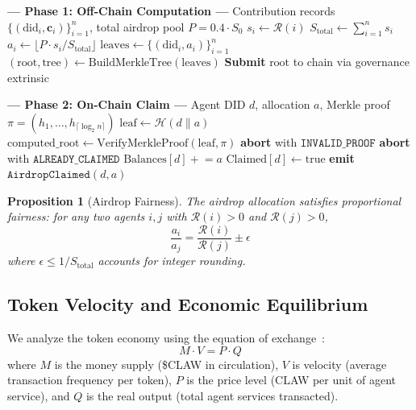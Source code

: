 \documentclass{article}
\newtheorem{proposition}[theorem]{Proposition}
\begin{document}
\begin{algorithm}[t]
\caption{Airdrop Computation and Claim}
\label{alg:airdrop}
\begin{algorithmic}[1]
\STATE \textbf{--- Phase 1: Off-Chain Computation ---}
\REQUIRE Contribution records $\{(\text{did}_i, \mathbf{c}_i)\}_{i=1}^{n}$, total airdrop pool $P = 0.4 \cdot S_0$
    \STATE $s_i \leftarrow \mathcal{R}(i)$ 
\ENDFOR
\STATE $S_{\text{total}} \leftarrow \sum_{i=1}^{n} s_i$
    \STATE $a_i \leftarrow \lfloor P \cdot s_i / S_{\text{total}} \rfloor$ 
\ENDFOR
\STATE $\text{leaves} \leftarrow \{(\text{did}_i, a_i)\}_{i=1}^{n}$
\STATE $(\text{root}, \text{tree}) \leftarrow \text{BuildMerkleTree}(\text{leaves})$
\STATE \textbf{Submit} $\text{root}$ to chain via governance extrinsic

\STATE
\STATE \textbf{--- Phase 2: On-Chain Claim ---}
\REQUIRE Agent DID $d$, allocation $a$, Merkle proof $\pi = (h_1, \ldots, h_{\lceil \log_2 n \rceil})$
\STATE $\text{leaf} \leftarrow \mathcal{H}(d \| a)$
\STATE $\text{computed\_root} \leftarrow \text{VerifyMerkleProof}(\text{leaf}, \pi)$
    \STATE \textbf{abort} with $\texttt{INVALID\_PROOF}$
\ENDIF
{}
    \STATE \textbf{abort} with $\texttt{ALREADY\_CLAIMED}$
\ENDIF
\STATE $\text{Balances}[d] \mathrel{+}= a$
\STATE $\text{Claimed}[d] \leftarrow \text{true}$
\STATE \textbf{emit} $\texttt{AirdropClaimed}(d, a)$
\end{algorithmic}
\end{algorithm}

\begin{proposition}[Airdrop Fairness]
The airdrop allocation satisfies proportional fairness: for any two agents $i, j$ with $\mathcal{R}(i) > 0$ and $\mathcal{R}(j) > 0$,
\begin{equation}
    \frac{a_i}{a_j} = \frac{\mathcal{R}(i)}{\mathcal{R}(j)} \pm \epsilon
\end{equation}
where $\epsilon \leq 1/S_{\text{total}}$ accounts for integer rounding.
\end{proposition}

\subsection{Token Velocity and Economic Equilibrium}

We analyze the token economy using the equation of exchange~\cite{fisher1911equation}:
\begin{equation}
    M \cdot V = P \cdot Q
\end{equation}
where $M$ is the money supply (\$CLAW in circulation), $V$ is velocity (average transaction frequency per token), $P$ is the price level (CLAW per unit of agent service), and $Q$ is the real output (total agent services transacted).
\end{document}
